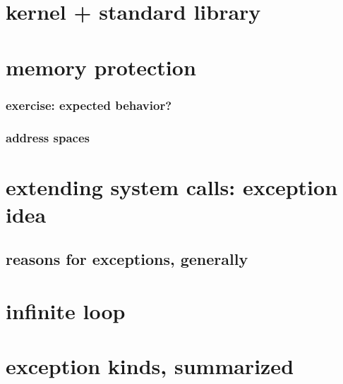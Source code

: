 \section{kernel + standard library}

\section{memory protection}

\subsubsection{exercise: expected behavior?}


%

\subsubsection{address spaces}


\section{extending system calls: exception idea}


\subsection{reasons for exceptions, generally}


\section{infinite loop}


\section{exception kinds, summarized}


